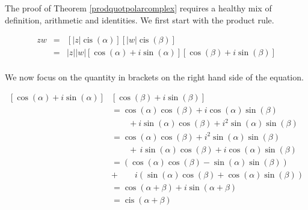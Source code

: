 \medskip


The proof of Theorem \ref{prodquotpolarcomplex} requires a healthy mix of definition, arithmetic and identities.  We first start with the product rule.

\[ \begin{array}{rcl}

zw & = & \left[|z|\operatorname{cis}(\alpha)\right] \left[|w|\operatorname{cis}(\beta)\right]  \\[3pt]
   & = & |z||w|\left[\cos(\alpha) + i\sin(\alpha)\right]\left[\cos(\beta) + i \sin(\beta)\right] \\ \end{array} \]

We now focus on the quantity in brackets on the right hand side of the equation.

\begin{align*}
\left[\cos(\alpha) + i\sin(\alpha)\right]&\left[\cos(\beta) + i \sin(\beta)\right]\\
 & = \cos(\alpha)\cos(\beta) + i\cos(\alpha)\sin(\beta) \\	
 & \quad\quad + i\sin(\alpha)\cos(\beta) + i^2 \sin(\alpha)\sin(\beta) \\																		 & =  \cos(\alpha)\cos(\beta) +  i^2 \sin(\alpha) \sin(\beta) \tag*{Rearranging terms}  \\
 & \quad\quad + \, i\sin(\alpha)\cos(\beta) +i\cos(\alpha)\sin(\beta)  \\
 & =  \left(\cos(\alpha)\cos(\beta) - \sin(\alpha) \sin(\beta)\right)\tag*{Since $i^2 = -1$}\\
 & + \quad\quad i\left(\sin(\alpha)\cos(\beta)+ \cos(\alpha)\sin(\beta)\right)  \tag*{Factor out $i$}\\	
 & = \cos(\alpha + \beta) + i \sin(\alpha+\beta)  \tag*{Sum identities} \\
 & = \operatorname{cis}(\alpha + \beta)  \tag*{Definition of `cis'}
\end{align*}

